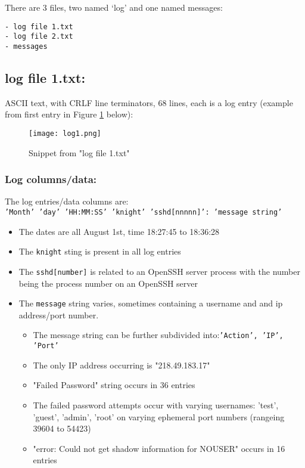 \documentclass[
	letterpaper, %
	10pt, %
	unnumberedsections, %
	twoside, %
]{APAAssignment}
\begin{document}
There are 3 files, two named `log' and one named messages:

\begin{verbatim}
- log file 1.txt
- log file 2.txt
- messages
\end{verbatim}

\subsection{log file 1.txt:}\label{log-file-1.txt}
ASCII text, with CRLF line terminators, 68 lines, each is a log entry
(example from first entry in Figure \ref{fig:log1} below): \\

\begin{figure}[!htp] %
	\centering
	\texttt{[image: log1.png]}
	\caption{Snippet from "log file 1.txt"}	\label{fig:log1}
\end{figure}

\subsubsection{Log columns/data:} The log entries/data columns are: \\
\texttt{'Month' 'day' 'HH:MM:SS' 'knight' 'sshd[nnnnn]': 'message string'}
\begin{itemize}
  \item The dates are all August 1st, time 18:27:45 to 18:36:28
  \item The \texttt{knight} sting is present in all log entries
  \item The \texttt{sshd{[}number{]}} is related to an OpenSSH server process with the number being the process number on an OpenSSH server 
  \item The \texttt{message} string varies, sometimes containing a username and and ip address/port number.
  \begin{itemize}
	\item The message string can be further subdivided into:\texttt{'Action', 'IP', 'Port'}
	\item The only IP address occurring is "218.49.183.17"
	\item "Failed Password" string occurs in 36 entries
	\item The failed password attempts occur with varying usernames: 'test', 'guest', 'admin', 'root' on varying ephemeral port numbers (rangeing 39604 to 54423)
	\item "error: Could not get shadow information for NOUSER" occurs in 16 entries
  \end{itemize}
\end{itemize}
\end{document}
